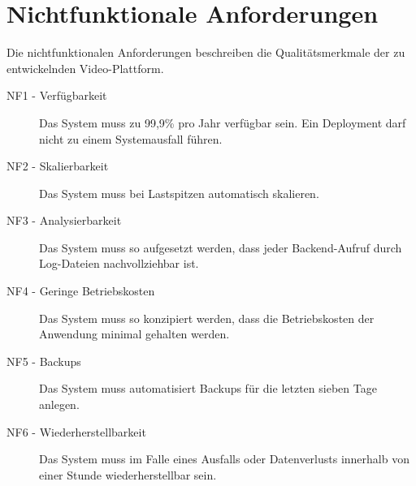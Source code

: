 \section{Nichtfunktionale Anforderungen}

Die nichtfunktionalen Anforderungen beschreiben die Qualitätsmerkmale der zu entwickelnden Video-Plattform.

\begin{description}
   \item[NF1 - Verfügbarkeit] Das System muss zu 99,9\% pro Jahr verfügbar sein. Ein Deployment darf nicht zu einem Systemausfall führen.
   \item[NF2 - Skalierbarkeit] Das System muss bei Lastspitzen automatisch skalieren.
   \item[NF3 - Analysierbarkeit] Das System muss so aufgesetzt werden, dass jeder Backend-Aufruf durch Log-Dateien nachvollziehbar ist.
   \item[NF4 - Geringe Betriebskosten] Das System muss so konzipiert werden, dass die Betriebskosten der Anwendung minimal gehalten werden.
   \item[NF5 - Backups] Das System muss automatisiert Backups für die letzten sieben Tage anlegen.
   \item[NF6 - Wiederherstellbarkeit] Das System muss im Falle eines Ausfalls oder Datenverlusts innerhalb von einer Stunde wiederherstellbar sein.
\end{description}
